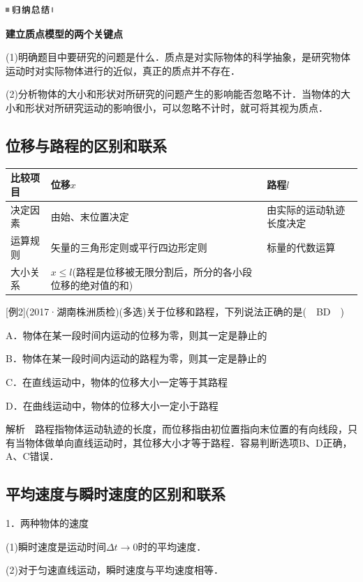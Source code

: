 \begin{center}\includegraphics[width=0.70833in,height=0.125in]{media/image13.png}

\textbf{建立质点模型的两个关键点}
\end{center}


(1)明确题目中要研究的问题是什么．质点是对实际物体的科学抽象，是研究物体运动时对实际物体进行的近似，真正的质点并不存在．

(2)分析物体的大小和形状对所研究的问题产生的影响能否忽略不计．当物体的大小和形状对所研究运动的影响很小，可以忽略不计时，就可将其视为质点．



\subsection{位移与路程的区别和联系}
\begin{longtable}[]{@{}lll@{}}
\toprule
比较项目 & 位移$x$ & 路程$l$\tabularnewline
\midrule
\endhead
决定因素 & 由始、末位置决定 & 由实际的运动轨迹长度决定\tabularnewline
运算规则 & 矢量的三角形定则或平行四边形定则 &
标量的代数运算\tabularnewline
大小关系 & $x\le l$(路程是位移被无限分割后，所分的各小段位移的绝对值的和)
&\tabularnewline
\bottomrule
\end{longtable}

{[}例2{]}(2017·湖南株洲质检)(多选)关于位移和路程，下列说法正确的是(　BD　)

A．物体在某一段时间内运动的位移为零，则其一定是静止的

B．物体在某一段时间内运动的路程为零，则其一定是静止的

C．在直线运动中，物体的位移大小一定等于其路程

D．在曲线运动中，物体的位移大小一定小于路程

解析　路程指物体运动轨迹的长度，而位移指由初位置指向末位置的有向线段，只有当物体做单向直线运动时，其位移大小才等于路程．容易判断选项B、D正确，A、C错误．

\newpage
\subsection{平均速度与瞬时速度的区别和联系}

1．两种物体的速度

(1)瞬时速度是运动时间$\Delta t\rightarrow 0$时的平均速度．

(2)对于匀速直线运动，瞬时速度与平均速度相等．

